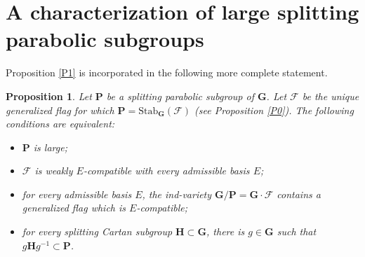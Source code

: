 \documentclass[12pt]{amsart}
\newcommand{\G}{\mathbf{G}}
\renewcommand{\H}{\mathbf{H}}
\renewcommand{\P}{\mathbf{P}}
\newcommand{\Ff}{\mathcal{F}}
\newcommand{\Stab}{\mathrm{Stab}}
\numberwithin{equation}{section}
\newtheorem{proposition}[theorem]{Proposition}
\theoremstyle{definition}
\begin{document}
\section{A characterization of large splitting parabolic subgroups}

\label{section-3}

Proposition \ref{P1} is incorporated in the following more complete statement.

\begin{proposition}
\label{P1bis}
Let $\P$ be a splitting parabolic subgroup of $\G$. Let $\Ff$ be the unique generalized flag for which $\P=\Stab_\G(\Ff)$ (see Proposition \ref{P0}). The following conditions are equivalent:
\begin{itemize}
\item[\rm (i)] $\P$ is large;
\item[\rm (ii)] $\Ff$ is weakly $E$-compatible with every admissible basis $E$;
\item[\rm (iii)] for every admissible basis $E$, the ind-variety $\G/\P=\G\cdot\Ff$ contains a generalized flag which is $E$-compatible;
\item[\rm (iv)] for every splitting Cartan subgroup $\H\subset\G$, there is $g\in\G$ such that $g\H g^{-1}\subset \P$.
\end{itemize}
\end{proposition}
\end{document}

